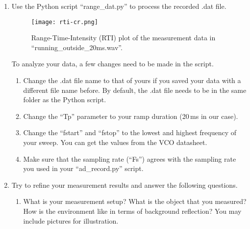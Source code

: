 \documentclass[letterpaper, 11pt]{article}
\begin{document}
\begin{enumerate}
	
	\item Use the Python script ``range\_dat.py'' to process the recorded .dat file. %
	
	\begin{figure}[h]
		\centering
		\texttt{[image: rti-cr.png]}
		\caption{Range-Time-Intensity (RTI) plot of the measurement data in ``running\_outside\_20ms.wav''.}
		\label{fig:rti-cr}
	\end{figure} 	
	
	
	To analyze your data, a few changes need to be made in the script.
	
		\begin{enumerate}
			\item Change the .dat file name to that of yours if you saved your data with a different file name before. By default, the .dat file needs to be in the same folder as the Python script.
			
			\item Change the ``Tp'' parameter to your ramp duration (20\,ms in our case).
			
			\item Change the ``fstart'' and ``fstop'' to the lowest and highest frequency of your sweep. You can get the values from the VCO datasheet. 
			
			\item Make sure that the sampling rate (``Fs'') agrees with the sampling rate you used in your ``ad\_record.py'' script. 
			
		\end{enumerate}
	\item Try to refine your measurement results and answer the following questions.
		\begin{enumerate}
			\item What is your measurement setup? What is the object that you measured? How is the environment like in terms of background reflection? You may include pictures for illustration. 
			

\end{enumerate}
\end{enumerate}
\end{document}
